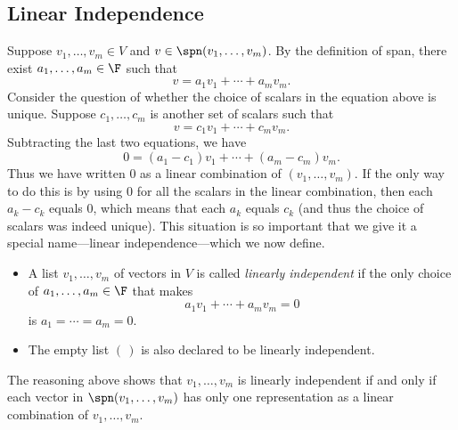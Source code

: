 \subsection{Linear Independence}

Suppose $v_1,\dots,v_m\in V$ and $v\in\spn(v_1,\dots,v_m)$. By the definition
of span, there exist $a_1,\dots,a_m\in\F$ such that
\[ v = a_1v_1+\cdots+a_mv_m. \]
Consider the question of whether the choice of scalars in the equation above is
unique. Suppose $c_1,\dots,c_m$ is another set of scalars such that
\[ v = c_1v_1+\cdots+c_mv_m. \]
Subtracting the last two equations, we have
\[ 0 = (a_1-c_1)v_1+\cdots+(a_m-c_m)v_m. \]
Thus we have written $0$ as a linear combination of $(v_1,\dots,v_m)$. If the
only way to do this is by using $0$ for all the scalars in the linear
combination, then each $a_k-c_k$ equals $0$, which means that each $a_k$ equals
$c_k$ (and thus the choice of scalars was indeed unique). This situation is so
important that we give it a special name---linear independence---which we now
define.

\begin{definition}\label{ax:2.15}\leavevmode
\begin{itemize}
\item A list $v_1,\dots,v_m$ of vectors in $V$ is called \emph{linearly
  independent} if the only choice of $a_1,\dots,a_m\in\F$ that makes
  \[ a_1v_1+\cdots+a_mv_m = 0 \]
  is $a_1=\cdots=a_m=0$.
\item The empty list $(\,)$ is also declared to be linearly independent.
\end{itemize}
\end{definition}

The reasoning above shows that $v_1,\dots,v_m$ is linearly independent if and
only if each vector in $\spn(v_1,\dots,v_m)$ has only one representation as a
linear combination of $v_1,\dots,v_m$.

